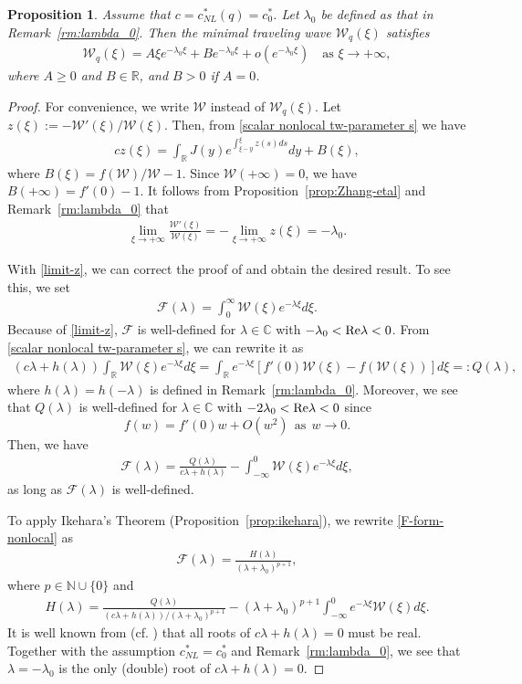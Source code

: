 \documentclass[11pt,a4paper]{article}
\newtheorem{proposition}[theorem]{\textbf{Proposition}}
\numberwithin{equation}{section}
\numberwithin{figure}{section}
\newcommand\bea{\begin{eqnarray}}
\newcommand\eea{\end{eqnarray}}
\newcommand\beaa{\begin{eqnarray*}}
\newcommand\eeaa{\end{eqnarray*}}
\begin{document}
\begin{proposition}\label{prop:correction-U-linear-decay}
Assume that $c=c_{NL}^*(q)=c^*_0$. Let $\lambda_0$ be defined as that in Remark~\ref{rm:lambda_0}.  Then the minimal traveling wave $\mathcal{W}_q(\xi)$ satisfies
\bea\label{decay-U-linear}
\mathcal{W}_q(\xi)=A\xi e^{-\lambda_0\xi}+Be^{-\lambda_0\xi}+o(e^{-\lambda_0\xi})\quad \mbox{as $\xi\to+\infty$},
\eea
where $A\geq0$ and $B\in \mathbb{R}$,
and $B>0$ if $A=0$.
\end{proposition}
\begin{proof}
For convenience, we write $\mathcal{W}$ instead of $\mathcal{W}_q(\xi)$.
Let $z(\xi):=-\mathcal{W}'(\xi)/\mathcal{W}(\xi)$. Then, from \eqref{scalar nonlocal tw-parameter s} we have
\beaa
cz(\xi)=\int_{\mathbb{R}}J(y)e^{\int_{\xi-y}^{\xi}z(s)ds}dy+B(\xi),
\eeaa
where $B(\xi)=f(\mathcal{W})/\mathcal{W}-1$.
Since $\mathcal{W}(+\infty)=0$, we have $B(+\infty)=f'(0)-1$.
It follows from Proposition~\ref{prop:Zhang-etal} and Remark~\ref{rm:lambda_0} that
\bea\label{limit-z}
\lim_{\xi\to+\infty}\frac{\mathcal{W}'(\xi)}{\mathcal{W}(\xi)}=-\lim_{\xi\to+\infty} z(\xi)=-\lambda_0.
\eea

With \eqref{limit-z}, we can correct the proof of \cite[Theorem 1.6]{Coville} and obtain the desired result. To see this, we set 
\bea\label{mathcal F}
\mathcal{F}(\lambda)=\int_0^{\infty}\mathcal{W}(\xi) e^{-\lambda \xi}d\xi.
\eea
Because of \eqref{limit-z},
$\mathcal{F}$ is well-defined for $\lambda\in\mathbb{C}$ with $-\lambda_0<{\rm Re}\lambda<0$.
From \eqref{scalar nonlocal tw-parameter s}, we can rewrite it as
\beaa
(c\lambda+h(\lambda))\int_{\mathbb{R}}\mathcal{W}(\xi)e^{-\lambda \xi}d\xi=
\int_{\mathbb{R}} e^{-\lambda \xi}[f'(0)\mathcal{W}(\xi)-f(\mathcal{W}(\xi))]d\xi=:Q(\lambda),
\eeaa
where $h(\lambda)=h(-\lambda)$ is defined in Remark~\ref{rm:lambda_0}.
Moreover, we see that $Q(\lambda)$ is well-defined for $\lambda\in\mathbb{C}$ with
$-2\lambda_0<{\rm Re} \lambda<0$
since
$$f(w)=f'(0)w+O(w^2)\ \ \text{as}\ \ w\to0.$$
Then, we have
\bea\label{F-form-nonlocal}
\mathcal{F}(\lambda)=\frac{Q(\lambda)}{c\lambda+h(\lambda)}-\int_{-\infty}^{0}\mathcal{W}(\xi)e^{-\lambda \xi}d\xi,
\eea
as long as $\mathcal{F}(\lambda)$ is well-defined.

To apply Ikehara's Theorem (Proposition~\ref{prop:ikehara}), we
rewrite \eqref{F-form-nonlocal} as
\beaa
\mathcal{F}(\lambda)=\frac{H(\lambda)}{(\lambda+\lambda_0)^{p+1}},
\eeaa
where $p\in\mathbb{N}\cup\{0\}$ and
\bea\label{Ikehara-form-nonlocal}
H(\lambda)=\frac{Q(\lambda)}{(c\lambda+h(\lambda))/(\lambda+\lambda_0)^{p+1}}
-(\lambda+\lambda_0)^{p+1}\int_{-\infty}^{0}e^{-\lambda \xi}\mathcal{W}(\xi) d\xi.
\eea
It is well known from (cf. \cite[p.2437]{Carr Chmaj}) that all roots of $c\lambda+h(\lambda)=0$ must be real.  Together with the assumption $c_{NL}^*=c^*_0$ and Remark~\ref{rm:lambda_0},
we see that $\lambda = -\lambda_0$ is the only (double) root of $c\lambda+h(\lambda)=0$.


\end{proof}
\end{document}
